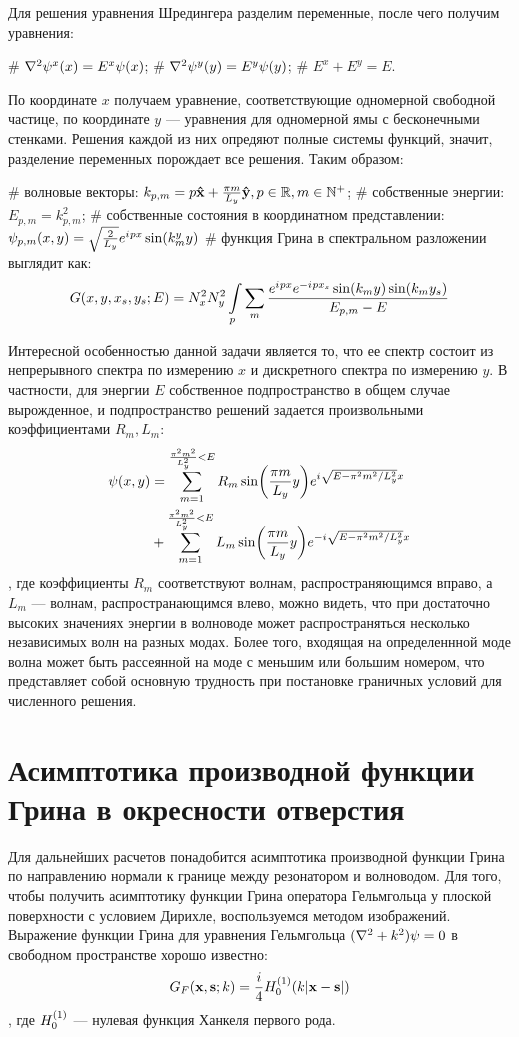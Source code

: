 Для решения уравнения Шредингера разделим переменные, после чего получим уравнения:
\begin{ilist}
# $\laplacian \psi^x(x) = E^x \psi(x)$;
# $\laplacian \psi^y(y) = E^y \psi(y)$;
# $E^x + E^y = E$.
\end{ilist}
По координате $x$ получаем уравнение, соответствующие одномерной свободной частице, по координате $y$ — уравнения для одномерной ямы с бесконечными стенками. Решения каждой из них опредяют полные системы функций, значит, разделение переменных порождает все решения. Таким образом:
\begin{ilist}
# волновые векторы: $k_{p, m} = p \vb{\hat{x}} + \frac{\pi m}{L_y} \vb{\hat{y}}, p \in \mathbb{R}, m \in \mathbb{N}^+$;
# собственные энергии: $E_{p, m} = k_{p, m}^2$;
# собственные состояния в координатном представлении: $\psi_{p, m}(x, y) = \sqrt{\frac{2}{L_y}} e^{{i\mkern1mu} p x} \sin(k^y_m y)$
# функция Грина в спектральном разложении выглядит как: 
\[
G(x, y, x_s, y_s; E) = N_x^2 N_y^2 \int\limits_p \sum\limits_m \frac{e^{{i\mkern1mu} p x} e^{-{i\mkern1mu} p x_s} \sin(k_m y) \sin(k_m y_s)}{E_{p, m} - E}
\]
\end{ilist}
Интересной особенностью данной задачи является то, что ее спектр состоит из непрерывного спектра по измерению $x$ и дискретного спектра по измерению $y$. В частности, для энергии $E$ собственное подпространство в общем случае вырожденное, и подпространство решений задается произвольными коэффициентами $R_m, L_m$:
\begin{align*}
\psi(x, y)
& = \sum\limits_{m = 1}^{\frac{\pi^2 m^2}{L_y^2} < E} R_m \sin(\frac{\pi m}{L_y} y) e^{{i\mkern1mu} \sqrt{E - \pi^2 m^2 / L_y^2} x} \\
& + \sum\limits_{m = 1}^{\frac{\pi^2 m^2}{L_y^2} < E} L_m \sin(\frac{\pi m}{L_y} y) e^{-{i\mkern1mu} \sqrt{E - \pi^2 m^2 / L_y^2} x}
\end{align*}
, где коэффициенты $R_m$ соответствуют волнам, распространяющимся вправо, а $L_m$ — волнам, распространающимся влево, можно видеть, что при достаточно высоких значениях энергии в волноводе может распространяться несколько независимых волн на разных модах. Более того, входящая на определеннной моде волна может быть рассеянной на моде с меньшим или большим номером, что представляет собой основную трудность при постановке граничных условий для численного решения.

\section{Асимптотика производной функции Грина в окресности отверстия}
Для дальнейших расчетов понадобится асимптотика производной функции Грина по направлению нормали к границе между резонатором и волноводом. Для того, чтобы получить асимптотику функции Грина оператора Гельмгольца у плоской поверхности с условием Дирихле, воспользуемся методом изображений. Выражение функции Грина для уравнения Гельмгольца $(\laplacian + k^2) \psi = 0$ в свободном пространстве хорошо известно:
\[
G_F(\vb{x}, \vb{s}; k) = \frac{i}{4} H_{0}^{(1)}(k |\vb{x} - \vb{s}|)
\],
где $H_{0}^{(1)}$ — нулевая функция Ханкеля первого рода\cite{hankel_first_kind}.

